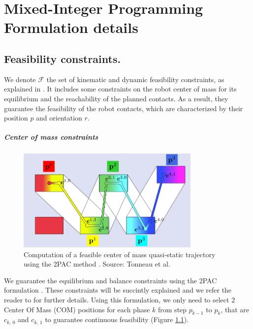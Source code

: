 \appendix

\chapter{Mixed-Integer Programming Formulation details}

\section{Feasibility constraints.\label{appendix:feasibility_constr}}
We denote $\mathcal{F}$ the set of kinematic and dynamic feasibility constraints, as explained in \cite{sl1m_v1}. 
It includes some constraints on the robot center of mass for its equilibrium and the reachability of the planned contacts.
As a result, they guarantee the feasibility of the robot contacts, which are characterized by their position $p$ and orientation $r$.

\paragraph{Center of mass constraints}
\begin{figure}[t]
    \centering
    \captionsetup[subfigure]{justification=centering}
    \includegraphics[width=0.8\textwidth]{Figures/Appendix/2pac_feasibility.png}
    \caption{Computation of a feasible center of mass quasi-static trajectory using the 2PAC method \cite{Tonneau2018_2PAC}. Source: Tonneau et al. \cite{sl1m_v1}}
    \label{fig:mip:feasibility_constr}
\end{figure}
We guarantee the equilibrium and balance constraints using the 2PAC formulation \cite{Tonneau2018_2PAC}.
These constraints will be succintly explained and we refer the reader to \cite{sl1m_v1} for further details.
Using this formulation, we only need to select 2 Center Of Mass (COM) positions for each phase $k$ from step $p_{k-1}$ to $p_k$, that are $c_{k,\:0}$ and $c_{k,\:1}$ to guarantee continuous feasibility (Figure \ref{fig:mip:feasibility_constr}).

